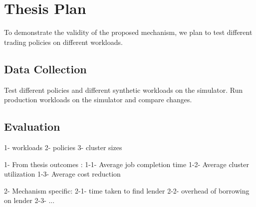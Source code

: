 \section{Thesis Plan}

To demonstrate the validity of the proposed mechanism, we plan to test different trading policies 
on different workloads.


\subsection{Data Collection}
Test different policies and different synthetic workloads on the simulator. 
Run production workloads on the simulator and compare changes.

\subsection{Evaluation}
1- workloads %
2- policies 
3- cluster sizes

1- From thesis outcomes :
    1-1- Average job completion time
    1-2- Average cluster utilization
    1-3- Average cost reduction

2- Mechanism specific: 
   2-1- time taken to find lender
   2-2- overhead of borrowing on lender
   2-3- ... 
